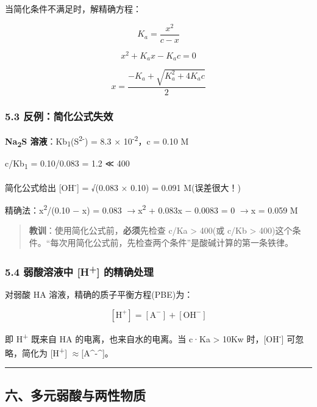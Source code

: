 \documentclass[a4paper,11pt]{ctexart}
\newcommand{\箭}{\ensuremath{\rightarrow}}
\newcommand{\左箭}{\ensuremath{\leftarrow}}
\newcommand{\上箭}{\ensuremath{\uparrow}}
\newcommand{\下箭}{\ensuremath{\downarrow}}
\newcommand{\衡}{\ensuremath{\rightleftharpoons}}
\newcommand{\双箭}{\ensuremath{\leftrightarrow}}
\newcommand{\约等于}{\ensuremath{\approx}}
\newcommand{\小于等于}{\ensuremath{\leq}}
\newcommand{\大于等于}{\ensuremath{\geq}}
\newcommand{\不等于}{\ensuremath{\neq}}
\newcommand{\西格马}{\ensuremath{\sigma}}
\newcommand{\派}{\ensuremath{\pi}}
\begin{document}
当简化条件不满足时，解精确方程：

\[
K_a = \frac{x^2}{c - x}
\]

\[
x^2 + K_a x - K_a c = 0
\]

\[
x = \frac{-K_a + \sqrt{K_a^2 + 4K_a c}}{2}
\]

\subsubsection{5.3 反例：简化公式失效}\label{ux53cdux4f8bux7b80ux5316ux516cux5f0fux5931ux6548}

\textbf{Na\textsubscript{2}S 溶液}：Kb\textsubscript{1}(S\textsuperscript{2-}) = 8.3 × 10\textsuperscript{-2}，c = 0.10 M

c/Kb\textsubscript{1} = 0.10/0.083 = 1.2 ≪ 400

简化公式给出 {[}OH\textsuperscript{-}{]} = √(0.083 × 0.10) = 0.091 M(误差很大！)

精确法：x\textsuperscript{2}/(0.10 − x) = 0.083 \箭 x\textsuperscript{2} + 0.083x − 0.0083 = 0 \箭 x = 0.059 M

\begin{quote}
\textbf{教训}：使用简化公式前，\textbf{必须}先检查 c/Ka \textgreater{} 400(或 c/Kb \textgreater{} 400)这个条件。``每次用简化公式前，先检查两个条件''是酸碱计算的第一条铁律。
\end{quote}

\subsubsection{\texorpdfstring{5.4 弱酸溶液中 {[}H\textsuperscript{+}{]} 的精确处理}{5.4 弱酸溶液中 {[}H+{]} 的精确处理}}\label{ux5f31ux9178ux6eb6ux6db2ux4e2d-h-ux7684ux7cbeux786eux5904ux7406}

对弱酸 HA 溶液，精确的质子平衡方程(PBE)为：

\[
[\mathrm{H^+}] = [\mathrm{A^-}] + [\mathrm{OH^-}]
\]

即 H\textsuperscript{+} 既来自 HA 的电离，也来自水的电离。当 c·Ka \textgreater{} 10Kw 时，{[}OH\textsuperscript{-}{]} 可忽略，简化为 {[}H\textsuperscript{+}{]} \约等于 [A^-^]。

\begin{center}\rule{0.5\linewidth}{0.5pt}\end{center}

\subsection{六、多元弱酸与两性物质}\label{ux516dux591aux5143ux5f31ux9178ux4e0eux4e24ux6027ux7269ux8d28}
\end{document}
